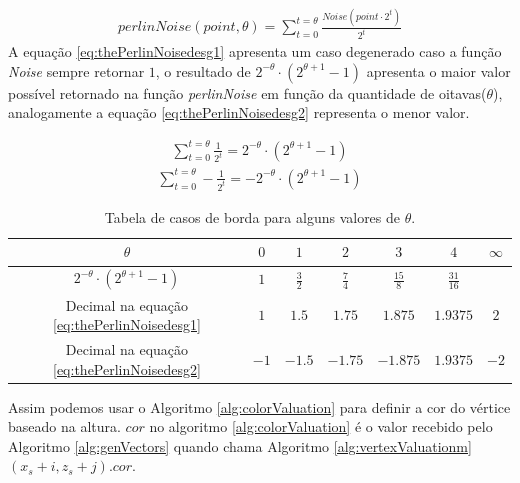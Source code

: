 \begin{equation}\label{eq:thePerlinNoise}
  \begin{split}
    perlinNoise(point, \theta) = \sum_{t=0}^{t=\theta} \frac{Noise(point \cdot 2^{t})}{2^{t}}
  \end{split}
\end{equation}
A equação \ref{eq:thePerlinNoisedesg1} apresenta um caso degenerado caso a função
\textit{Noise} sempre retornar $1$, o resultado de $2^{-\theta} \cdot (2^{\theta +1}-1)$
apresenta o maior valor possível retornado na função \textit{perlinNoise} em função da quantidade 
de oitavas($\theta$), analogamente a equação \ref{eq:thePerlinNoisedesg2} representa o menor valor.
 
\begin{equation}\label{eq:thePerlinNoisedesg1}
  \begin{split}
    \sum_{t=0}^{t=\theta} \frac{1}{2^{t}} = 2^{-\theta} \cdot (2^{\theta +1}-1)
  \end{split}
\end{equation}
\begin{equation}\label{eq:thePerlinNoisedesg2}
  \begin{split}
    \sum_{t=0}^{t=\theta} -\frac{1}{2^{t}} = -2^{-\theta} \cdot (2^{\theta +1}-1)
  \end{split}
\end{equation}

\begin{table}[H]
    \centering
    \caption{Tabela de casos de borda para alguns valores de $\theta$.}
    \label{tab:degenerateNoise}
    \begin{tabular}{| c | c c c c c c|}
        \hline
        $\theta$ & $0$ & $1$ & $2$ & $3$ & $4$ & $\infty$\\
        \hline
        $2^{-\theta} \cdot (2^{\theta +1}-1)$           & $1$  & $\frac{3}{2}$ & $\frac{7}{4}$ & $\frac{15}{8}$    & $\frac{31}{16}$ &   \\
        Decimal na equação \ref{eq:thePerlinNoisedesg1} & $1$  & $1.5$   & $1.75$  & $1.875$ & $1.9375$  & $2$  \\
        Decimal na equação \ref{eq:thePerlinNoisedesg2} & $-1$ & $-1.5$  & $-1.75$ & $-1.875$ & $1.9375$ & $-2$  \\
        \hline
    \end{tabular}
\end{table}

Assim podemos
usar o Algoritmo \ref{alg:colorValuation} para definir a cor do vértice baseado na altura.
$cor$ no algoritmo \ref{alg:colorValuation} é o valor recebido pelo Algoritmo \ref{alg:genVectors}
quando chama Algoritmo \ref{alg:vertexValuationm}$(x_{s} + i, z_{s} + j).cor$.

